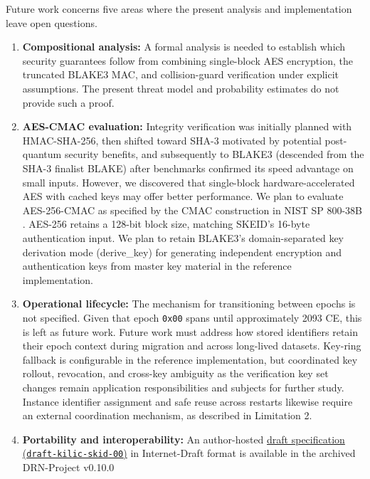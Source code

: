 \documentclass[a4paper,fleqn]{cas-sc}
\begin{document}
Future work concerns five areas where the present analysis and
implementation leave open questions.

\begin{enumerate}
\def\labelenumi{\arabic{enumi}.}
\item
  \textbf{Compositional analysis:} A formal analysis is needed to
  establish which security guarantees follow from combining single-block
  AES encryption, the truncated BLAKE3 MAC, and collision-guard
  verification under explicit assumptions. The present threat model and
  probability estimates do not provide such a proof.
\item
  \textbf{AES-CMAC evaluation:} Integrity verification was initially
  planned with HMAC-SHA-256, then shifted toward SHA-3 motivated by
  potential post-quantum security benefits, and subsequently to BLAKE3
  (descended from the SHA-3 finalist BLAKE) after benchmarks confirmed
  its speed advantage on small inputs. However, we discovered that
  single-block hardware-accelerated AES with cached keys may offer
  better performance. We plan to evaluate AES-256-CMAC as specified by
  the CMAC construction in NIST SP 800-38B \citep{nistsp80038b}. AES-256
  retains a 128-bit block size, matching SKEID's 16-byte authentication
  input. We plan to retain BLAKE3's domain-separated key derivation mode
  (derive\_key) for generating independent encryption and authentication
  keys from master key material in the reference implementation.
\item
  \textbf{Operational lifecycle:} The mechanism for transitioning
  between epochs is not specified. Given that epoch \texttt{0x00} spans
  until approximately 2093 CE, this is left as future work. Future work
  must address how stored identifiers retain their epoch context during
  migration and across long-lived datasets. Key-ring fallback is
  configurable in the reference implementation, but coordinated key
  rollout, revocation, and cross-key ambiguity as the verification key
  set changes remain application responsibilities and subjects for
  further study. Instance identifier assignment and safe reuse across
  restarts likewise require an external coordination mechanism, as
  described in Limitation 2.
\item
  \textbf{Portability and interoperability:} An author-hosted
  \href{https://github.com/duranserkan/DRN-Project/blob/release/v0.10.0/docs/draft-skid-00.md}{draft
  specification (\texttt{draft-kilic-skid-00})} in Internet-Draft format
  \citep{draft-skid} is available in the archived DRN-Project v0.10.0

\end{enumerate}
\end{document}
